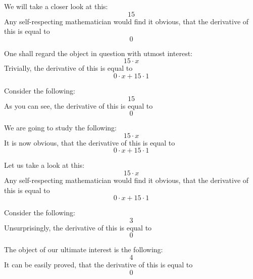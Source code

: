 \documentclass{article}
\begin{document}
We will take a closer look at this:
\begin{equation}
15 
\end{equation}
Any self-respecting mathematician would find it obvious, that the derivative of this is equal to
\begin{equation}
0 
\end{equation}

One shall regard the object in question with utmost interest:
\begin{equation}
15 \cdot x 
\end{equation}
Trivially, the derivative of this is equal to
\begin{equation}
0 \cdot x + 15 \cdot 1 
\end{equation}

Consider the following:
\begin{equation}
15 
\end{equation}
As you can see, the derivative of this is equal to
\begin{equation}
0 
\end{equation}

We are going to study the following:
\begin{equation}
15 \cdot x 
\end{equation}
It is now obvious, that the derivative of this is equal to
\begin{equation}
0 \cdot x + 15 \cdot 1 
\end{equation}

Let us take a look at this:
\begin{equation}
15 \cdot x 
\end{equation}
Any self-respecting mathematician would find it obvious, that the derivative of this is equal to
\begin{equation}
0 \cdot x + 15 \cdot 1 
\end{equation}

Consider the following:
\begin{equation}
3 
\end{equation}
Unsurprisingly, the derivative of this is equal to
\begin{equation}
0 
\end{equation}

The object of our ultimate interest is the following:
\begin{equation}
4 
\end{equation}
It can be easily proved, that the derivative of this is equal to
\begin{equation}
0 
\end{equation}
\end{document}
